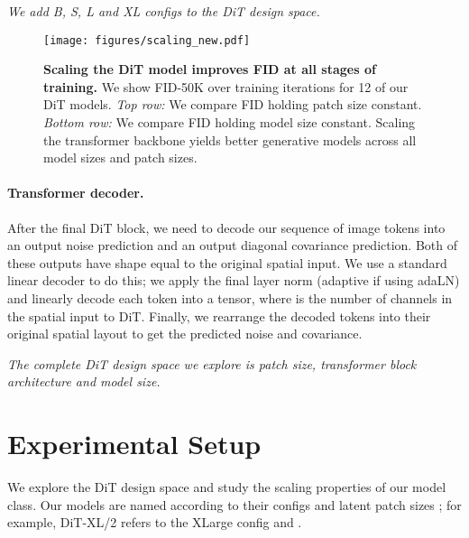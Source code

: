 \documentclass[10pt,twocolumn,letterpaper]{article}
\begin{document}
\textit{We add B, S, L and XL configs to the DiT design space.}


\begin{figure*}\centering
\texttt{[image: figures/scaling\_new.pdf]}
\caption{\textbf{Scaling the DiT model improves FID at all stages of training.} We show FID-50K over training iterations for 12 of our DiT models. \emph{Top row:} We compare FID holding patch size constant. \emph{Bottom row:} We compare FID holding model size constant. Scaling the transformer backbone yields better generative models across all model sizes and patch sizes.}\vspace{-2mm}
\label{fig:scaling}
\end{figure*}

\vspace{-2mm}
\paragraph{Transformer decoder.}
After the final DiT block, we need to decode our sequence of image tokens into an output noise prediction and an output diagonal covariance prediction. Both of these outputs have shape equal to the original spatial input. We use a standard linear decoder to do this; we apply the final layer norm (adaptive if using adaLN) and linearly decode each token into a  tensor, where  is the number of channels in the spatial input to DiT. Finally, we rearrange the decoded tokens into their original spatial layout to get the predicted noise and covariance.

\textit{The complete DiT design space we explore is patch size, transformer block architecture and model size.}

\section{Experimental Setup}

We explore the DiT design space and study the scaling properties of our model class. Our models are named according to their configs and latent patch sizes ; for example, DiT-XL/2 refers to the XLarge config and .
\end{document}
